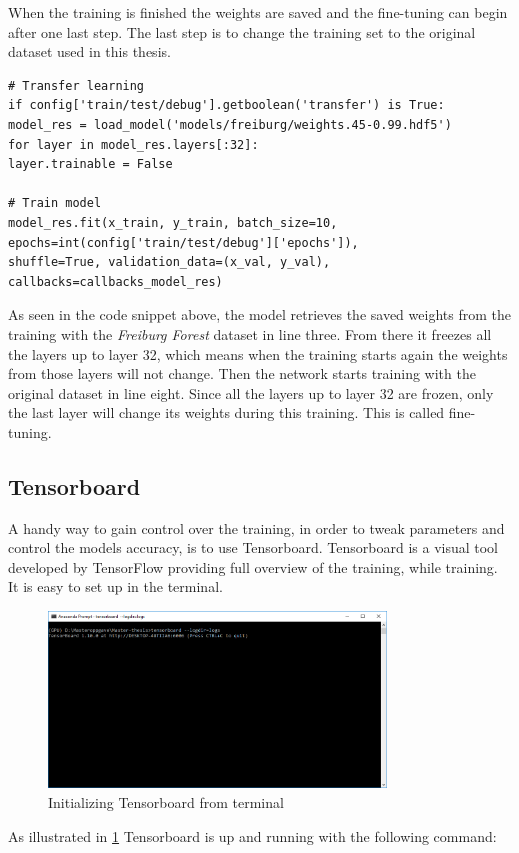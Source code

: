 \documentclass[USenglish]{ifimaster}  %
\begin{document}
When the training is finished the weights are saved and the fine-tuning can begin after one last step. The last step is to change the training set to the original dataset used in this thesis.

\begin{verbatim}
# Transfer learning
if config['train/test/debug'].getboolean('transfer') is True:
model_res = load_model('models/freiburg/weights.45-0.99.hdf5')
for layer in model_res.layers[:32]:
layer.trainable = False 

# Train model
model_res.fit(x_train, y_train, batch_size=10,
epochs=int(config['train/test/debug']['epochs']),
shuffle=True, validation_data=(x_val, y_val),
callbacks=callbacks_model_res)
\end{verbatim}
As seen in the code snippet above, the model retrieves the saved weights from the training with the \textit{Freiburg Forest} dataset in line three. From there it freezes all the layers up to layer 32, which means when the training starts again the weights from those layers will not change. Then the network starts training with the original dataset in line eight. Since all the layers up to layer 32 are frozen, only the last layer will change its weights during this training. This is called fine-tuning. 

\subsection{Tensorboard}
A handy way to gain control over the training, in order to tweak parameters and control the models accuracy, is to use Tensorboard. Tensorboard is a visual tool developed by TensorFlow providing full overview of the training, while training. It is easy to set up in the terminal.
\begin{figure}[ht]
    \centering
    \includegraphics[width=0.8\textwidth]{bilder/tensorboard_anaconda_prompt.PNG}
    \caption{Initializing Tensorboard from terminal}
    \label{fig:tensorboard_anaconda_prompt}
\end{figure}
As illustrated in \cref{fig:tensorboard_anaconda_prompt} Tensorboard is up and running with the following command: 
\end{document}
